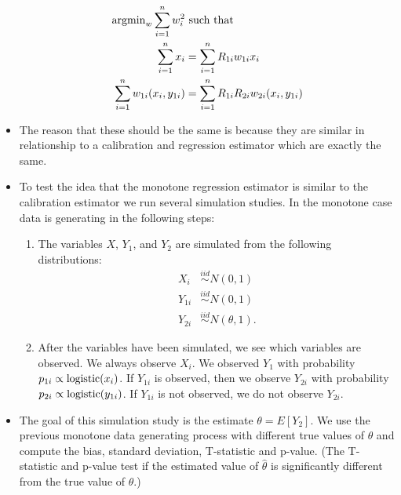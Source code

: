\begin{itemize}
    \begin{align*}
      {\text{argmin}}_w \sum_{i = 1}^n w_i^2& \text{ such that }\\
      \sum_{i = 1}^n x_i &= \sum_{i = 1}^n R_{1i} w_{1i} x_i \\
      \sum_{i = 1}^n w_{1i} (x_i, y_{1i}) &= \sum_{i = 1}^n R_{1i} R_{2i} w_{2i}
      (x_i, y_{1i}) \\
    \end{align*}
  
  \item The reason that these should be the same is because they are similar in
    relationship to a calibration and regression estimator which are exactly the
    same.
    
  \item To test the idea that the monotone regression estimator is similar to
    the calibration estimator we run several simulation studies. In the monotone
    case data is generating in the following steps:

    \begin{enumerate}
      \item The variables $X$, $Y_1$, and $Y_2$ are simulated from the following
        distributions:
        \begin{align*}
          X_i &\stackrel{iid}{\sim} N(0, 1) \\
          Y_{1i} &\stackrel{iid}{\sim} N(0, 1) \\
          Y_{2i} &\stackrel{iid}{\sim} N(\theta, 1).
        \end{align*}

      \item After the variables have been simulated, we see which variables are
        observed. We always observe $X_i$. We observed $Y_1$ with
        probability $p_{1i} \propto {\text{logistic}}(x_i)$. If $Y_{1i}$ is observed,
        then we observe $Y_{2i}$ with probability $p_{2i} \propto
        {\text{logistic}}(y_{1i})$. If $Y_{1i}$ is not observed, we do not observe
        $Y_{2i}$.
    \end{enumerate}

  \item The goal of this simulation study is the estimate $\theta = E[Y_2]$. We
    use the previous monotone data generating process with different true values
    of $\theta$ and compute the bias, standard deviation, T-statistic and
    p-value. (The T-statistic and p-value test if the estimated value of $\hat
    \theta$ is significantly different from the true value of $\theta$.)

    
    
    

\end{itemize}

